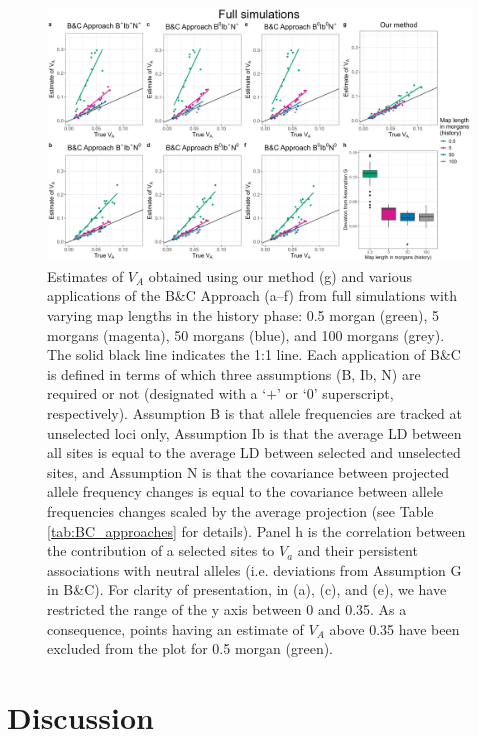 \documentclass[12pt]{article}
\begin{document}
\begin{bibunit}
\begin{landscape}
\begin{figure}[H]
\begin{center}
\includegraphics[scale = 0.14]{Figures/BC_full.jpg}
\end{center}
\caption{Estimates of $V_A$ obtained using our method (g) and various applications of the B\&C Approach (a--f) from full simulations with varying map lengths in the history phase: 0.5 morgan (green), 5 morgans (magenta), 50 morgans (blue), and 100 morgans (grey). The solid black line indicates the 1:1 line. Each application of B\&C is defined in terms of which three assumptions (B, Ib, N) are required or not (designated with a `$+$' or `0' superscript, respectively). Assumption B is that allele frequencies are tracked at unselected loci only, Assumption Ib is that the average LD between all sites is equal to the average LD between selected and unselected sites, and Assumption N is that the covariance between projected allele frequency changes is equal to the covariance between allele frequencies changes scaled by the average projection (see Table \ref{tab:BC_approaches} for details). Panel h is the correlation between the contribution of a selected sites to $V_a$ and their persistent associations with neutral alleles (i.e. deviations from Assumption G in B\&C). For clarity of presentation, in (a), (c), and (e), we have restricted the range of the y axis between 0 and 0.35. As a consequence, points having an estimate of $V_A$ above 0.35 have been excluded from the plot for 0.5 morgan (green).}
    \label{fig:BC_full}
\end{figure}
\end{landscape}
\restoregeometry


\section*{Discussion}


\end{bibunit}
\end{document}
